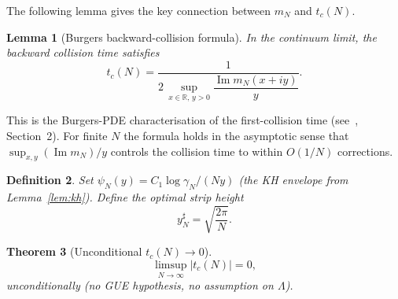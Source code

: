\documentclass[11pt,reqno]{amsart}
\newtheorem{theorem}{Theorem}[section]
\newtheorem{lemma}[theorem]{Lemma}
\newtheorem{definition}[theorem]{Definition}
\newcommand{\Lam}{\Lambda}
\newcommand{\tc}{t_c}
\newcommand{\mN}{m_N}
\newcommand{\gN}{\gamma_N}
\newcommand{\yN}{y_N^{\sharp}}
\begin{document}
The following lemma gives the key connection between $\mN$ and $\tc(N)$.

\begin{lemma}[Burgers backward-collision formula]\label{lem:burgers}
In the continuum limit, the backward collision time satisfies
\begin{equation}
  \tc(N) = \frac{1}{2\,\sup_{x \in \mathbb{R},\, y > 0}
    \dfrac{\operatorname{Im} \mN(x+iy)}{y}}.
\end{equation}
\end{lemma}

This is the Burgers-PDE characterisation of the first-collision time
(see~\cite{polymath15}, Section~2).
For finite $N$ the formula holds in the asymptotic sense that
$\sup_{x,y}(\operatorname{Im}\mN)/y$ controls the collision time to within
$O(1/N)$ corrections.

\begin{definition}
Set $\psi_N(y) = C_1 \log\gN / (Ny)$ (the KH envelope from Lemma~\ref{lem:kh}).
Define the \emph{optimal strip height}
\begin{equation}
  \yN = \sqrt{\frac{2\pi}{N}}.
\end{equation}
\end{definition}

\begin{theorem}[Unconditional $\tc(N)\to 0$]\label{thm:tc}
\begin{equation}
  \limsup_{N\to\infty} |\tc(N)| = 0,
\end{equation}
unconditionally (no GUE hypothesis, no assumption on $\Lam$).
\end{theorem}
\end{document}
